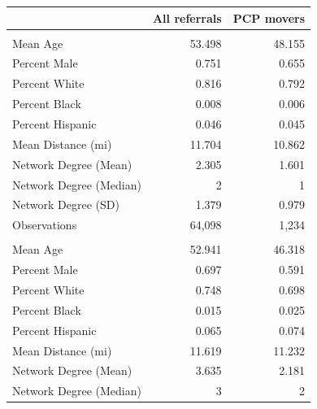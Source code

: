\begin{tabular}{lrr}
\toprule
  & All referrals & PCP movers\\
\midrule
\addlinespace[0.3em]
\multicolumn{3}{l}{\textbf{Orthopedic Surgery}}\\
\hspace{1em}Mean Age & 53.498 & 48.155\\
\hspace{1em}Percent Male & 0.751 & 0.655\\
\hspace{1em}Percent White & 0.816 & 0.792\\
\hspace{1em}Percent Black & 0.008 & 0.006\\
\hspace{1em}Percent Hispanic & 0.046 & 0.045\\
\hspace{1em}Mean Distance (mi) & 11.704 & 10.862\\
\hspace{1em}Network Degree (Mean) & 2.305 & 1.601\\
\hspace{1em}Network Degree (Median) & 2 & 1\\
\hspace{1em}Network Degree (SD) & 1.379 & 0.979\\
\hspace{1em}Observations & 64,098 & 1,234\\
\addlinespace[0.3em]
\multicolumn{3}{l}{\textbf{Cardiology}}\\
\hspace{1em}Mean Age & 52.941 & 46.318\\
\hspace{1em}Percent Male & 0.697 & 0.591\\
\hspace{1em}Percent White & 0.748 & 0.698\\
\hspace{1em}Percent Black & 0.015 & 0.025\\
\hspace{1em}Percent Hispanic & 0.065 & 0.074\\
\hspace{1em}Mean Distance (mi) & 11.619 & 11.232\\
\hspace{1em}Network Degree (Mean) & 3.635 & 2.181\\
\hspace{1em}Network Degree (Median) & 3 & 2\\

\end{tabular}
